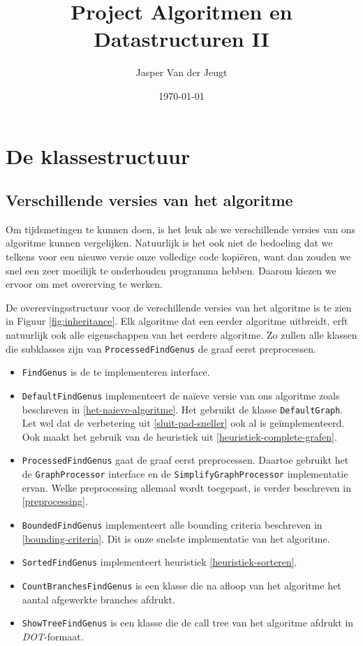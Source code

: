 \documentclass{article}
\title{Project Algoritmen en Datastructuren II}
\author{Jasper Van der Jeugt}
\date{\today}
\begin{document}
\maketitle
\tableofcontents

\section{De klassestructuur}

\subsection{Verschillende versies van het algoritme}
Om tijdsmetingen te kunnen doen, is het leuk als we verschillende versies van
ons algoritme kunnen vergelijken. Natuurlijk is het ook niet de bedoeling dat
we telkens voor een nieuwe versie onze volledige code kopi\"eren, want dan
zouden we snel een zeer moeilijk te onderhouden programma hebben. Daarom kiezen
we ervoor om met overerving te werken.
\newline

De overervingsstructuur voor de verschillende versies van het algoritme is te
zien in Figuur \ref{fig:inheritance}. Elk algoritme dat een eerder algoritme
uitbreidt, erft natuurlijk ook alle eigenschappen van het eerdere algoritme.
Zo zullen alle klassen die subklasses zijn van \verb#ProcessedFindGenus# de
graaf eerst preprocessen.
\newline

\begin{itemize}
\item \verb#FindGenus# is de te implementeren interface.
\item \verb#DefaultFindGenus# implementeert de na\"ieve versie van ons algoritme
zoals beschreven in \ref{het-naieve-algoritme}. Het gebruikt de klasse
\verb#DefaultGraph#. Let wel dat de verbetering uit \ref{sluit-pad-sneller} ook
al is ge\"implementeerd. Ook maakt het gebruik van de heuristiek
uit \ref{heuristiek-complete-grafen}.
\item \verb#ProcessedFindGenus# gaat de graaf eerst preprocessen. Daartoe
gebruikt het de \verb#GraphProcessor# interface en de
\verb#SimplifyGraphProcessor# implementatie ervan. Welke preprocessing allemaal
wordt toegepast, is verder beschreven in \ref{preprocessing}.
\item \verb#BoundedFindGenus# implementeert alle bounding criteria beschreven
in \ref{bounding-criteria}. Dit is onze snelste implementatie van het algoritme.
\item \verb#SortedFindGenus# implementeert heuristiek \ref{heuristiek-sorteren}.
\item \verb#CountBranchesFindGenus# is een klasse die na afloop van het
algoritme het aantal afgewerkte branches afdrukt.
\item \verb#ShowTreeFindGenus# is een klasse die de call tree van het algoritme
afdrukt in \emph{DOT}-formaat.
\end{itemize}
\end{document}
